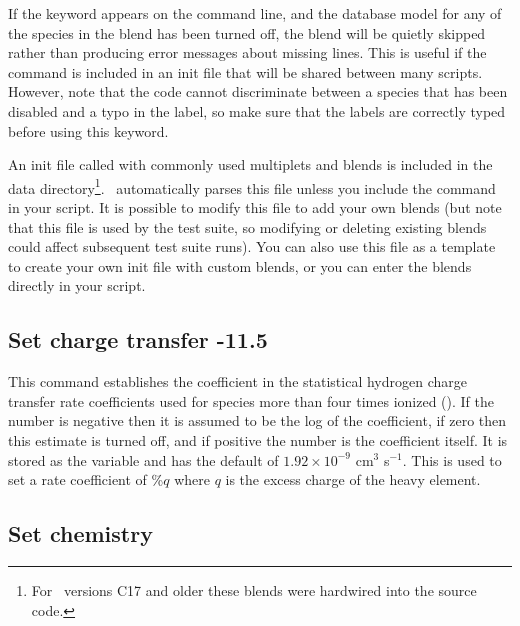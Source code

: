 If the keyword  appears on the  command
line, and the database model for any of the species in the blend has been
turned off, the blend will be quietly skipped rather than producing error
messages about missing lines. This is useful if the 
command is included in an init file that will be shared between many scripts.
However, note that the code cannot discriminate between a species that has
been disabled and a typo in the label, so make sure that the labels are
correctly typed before using this keyword.

An init file called  with commonly used multiplets and
blends is included in the data directory\footnote{For \Cloudy\ versions C17 and
  older these blends were hardwired into the source code.}. \Cloudy\ automatically
parses this file unless you include the  command in your
script. It is possible to modify this file to add your own blends (but note that
this file is used by the test suite, so modifying or deleting existing blends
could affect subsequent test suite runs). You can also use this file as a
template to create your own init file with custom blends, or you can enter the
blends directly in your script.

\subsection{Set charge transfer -11.5}

This command establishes the coefficient in the statistical hydrogen
charge transfer rate coefficients used for species more than four times
ionized (\citealp{Ferland1997}).
If the number is negative then it is assumed
to be the log of the coefficient,
if zero then this estimate is turned off,
and if positive the number is the coefficient itself.
It is stored as the
variable  and has the default of
$1.92\times 10^{-9}$ cm$^3$ s$^{-1}$.
This is used to
set a rate coefficient of  \%$q$
where $q$ is the excess charge of the heavy element.

\subsection{Set chemistry}

